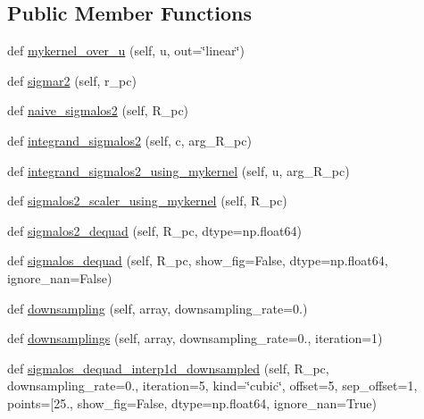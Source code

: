 \subsection*{Public Member Functions}
\begin{DoxyCompactItemize}
\item 
def \hyperlink{classdsph__model_1_1dSph__model_a5e0091742da19919dc6c085a806ad6e0}{mykernel\+\_\+over\+\_\+u} (self, u, out=\char`\"{}linear\char`\"{})
\item 
def \hyperlink{classdsph__model_1_1dSph__model_a1c6185c02a3f58951b7ed9b75a348f49}{sigmar2} (self, r\+\_\+pc)
\item 
def \hyperlink{classdsph__model_1_1dSph__model_a9db5b642eb5007933136db35b3acf84a}{naive\+\_\+sigmalos2} (self, R\+\_\+pc)
\item 
def \hyperlink{classdsph__model_1_1dSph__model_a97bf665bdc2ff464da2c685f6f182088}{integrand\+\_\+sigmalos2} (self, c, arg\+\_\+\+R\+\_\+pc)
\item 
def \hyperlink{classdsph__model_1_1dSph__model_a5df6fa479eb9092d850da8779073eed5}{integrand\+\_\+sigmalos2\+\_\+using\+\_\+mykernel} (self, u, arg\+\_\+\+R\+\_\+pc)
\item 
def \hyperlink{classdsph__model_1_1dSph__model_a14692f81c0bffc790d5daf7f4e6464c1}{sigmalos2\+\_\+scaler\+\_\+using\+\_\+mykernel} (self, R\+\_\+pc)
\item 
def \hyperlink{classdsph__model_1_1dSph__model_a87273cf6ad641b1d12f9b236821807c6}{sigmalos2\+\_\+dequad} (self, R\+\_\+pc, dtype=np.\+float64)
\item 
def \hyperlink{classdsph__model_1_1dSph__model_a5b73e854e8ac1b1c6a467498cd181e7a}{sigmalos\+\_\+dequad} (self, R\+\_\+pc, show\+\_\+fig=False, dtype=np.\+float64, ignore\+\_\+nan=False)
\item 
def \hyperlink{classdsph__model_1_1dSph__model_a4d9e1c397b4ae379c680bc7453845781}{downsampling} (self, array, downsampling\+\_\+rate=0.)
\item 
def \hyperlink{classdsph__model_1_1dSph__model_aa362ce682d90de77e755374efa153cf7}{downsamplings} (self, array, downsampling\+\_\+rate=0., iteration=1)
\item 
def \hyperlink{classdsph__model_1_1dSph__model_a0046cd7677792835d8cfafe83dbe276c}{sigmalos\+\_\+dequad\+\_\+interp1d\+\_\+downsampled} (self, R\+\_\+pc, downsampling\+\_\+rate=0., iteration=5, kind=\char`\"{}cubic\char`\"{}, offset=5, sep\+\_\+offset=1, points=\mbox{[}25., show\+\_\+fig=False, dtype=np.\+float64, ignore\+\_\+nan=True)
\item 

\end{DoxyCompactItemize}
